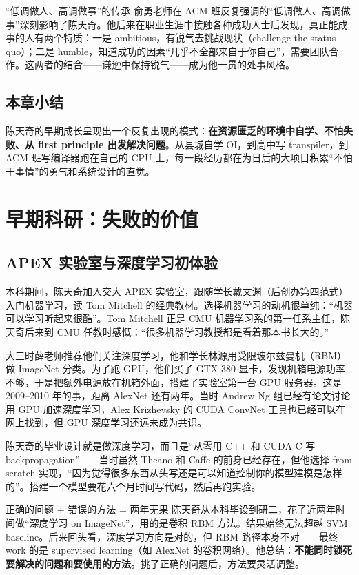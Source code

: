 \documentclass[a4paper]{article}
\begin{document}
\begin{importantbox}{``低调做人、高调做事''的传承}
俞勇老师在 ACM 班反复强调的``低调做人、高调做事''深刻影响了陈天奇。他后来在职业生涯中接触各种成功人士后发现，真正能成事的人有两个特质：一是 ambitious，有锐气去挑战现状（challenge the status quo）；二是 humble，知道成功的因素``几乎不全部来自于你自己''，需要团队合作。这两者的结合------谦逊中保持锐气------成为他一贯的处事风格。
\end{importantbox}

\subsection{本章小结}

陈天奇的早期成长呈现出一个反复出现的模式：\textbf{在资源匮乏的环境中自学、不怕失败、从 first principle 出发解决问题}。从县城自学 OI，到高中写 transpiler，到 ACM 班写编译器跑在自己的 CPU 上，每一段经历都在为日后的大项目积累``不怕干事情''的勇气和系统设计的直觉。

\section{早期科研：失败的价值}

\subsection{APEX 实验室与深度学习初体验}

本科期间，陈天奇加入交大 APEX 实验室，跟随学长戴文渊（后创办第四范式）入门机器学习，读 Tom Mitchell 的经典教材。选择机器学习的动机很单纯：``机器可以学习听起来很酷''。Tom Mitchell 正是 CMU 机器学习系的第一任系主任，陈天奇后来到 CMU 任教时感慨：``很多机器学习教授都是看着那本书长大的。''

大三时薛老师推荐他们关注深度学习，他和学长林源用受限玻尔兹曼机（RBM）做 ImageNet 分类。为了跑 GPU，他们买了 GTX 380 显卡，发现机箱电源功率不够，于是把额外电源放在机箱外面，搭建了实验室第一台 GPU 服务器。这是 2009--2010 年的事，距离 AlexNet 还有两年。当时 Andrew Ng 组已经有论文讨论用 GPU 加速深度学习，Alex Krizhevsky 的 CUDA ConvNet 工具也已经可以在网上找到，但 GPU 深度学习还远未成为共识。

陈天奇的毕业设计就是做深度学习，而且是``从零用 C++ 和 CUDA C 写 backpropagation''------当时虽然 Theano 和 Caffe 的前身已经存在，但他选择 from scratch 实现，``因为觉得很多东西从头写还是可以知道控制你的模型建模是怎样的''。搭建一个模型要花六个月时间写代码，然后再跑实验。

\begin{warningbox}{正确的问题 + 错误的方法 = 两年无果}
陈天奇从本科毕设到研二，花了近两年时间做``深度学习 on ImageNet''，用的是卷积 RBM 方法。结果始终无法超越 SVM baseline。后来回头看，深度学习方向是对的，但 RBM 路径本身不对------最终 work 的是 supervised learning（如 AlexNet 的卷积网络）。他总结：\textbf{不能同时锁死要解决的问题和要使用的方法}。挑了正确的问题后，方法要灵活调整。
\end{warningbox}
\end{document}
